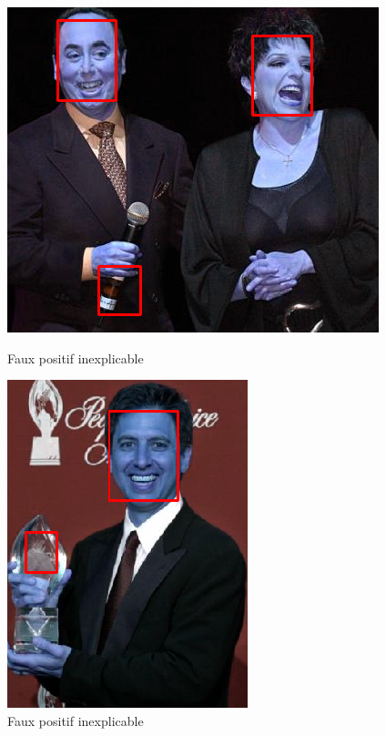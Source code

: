 \documentclass[a4paper,11pt]{article}
\begin{document}
\begin{figure}[H]
    \centering
    \begin{minipage}[c]{0.50\linewidth}
        \begin{center}
            \includegraphics[scale=0.45]{facenetFP3.png}
            \caption{Faux positif inexplicable}
        \end{center}
    \end{minipage} \hfill
    \begin{minipage}[c]{0.45\linewidth}
        \begin{center}
            \includegraphics[scale=0.45]{facenetFP4.png}
            \caption{Faux positif inexplicable}
        \end{center}
    \end{minipage}
\end{figure}
\end{document}
